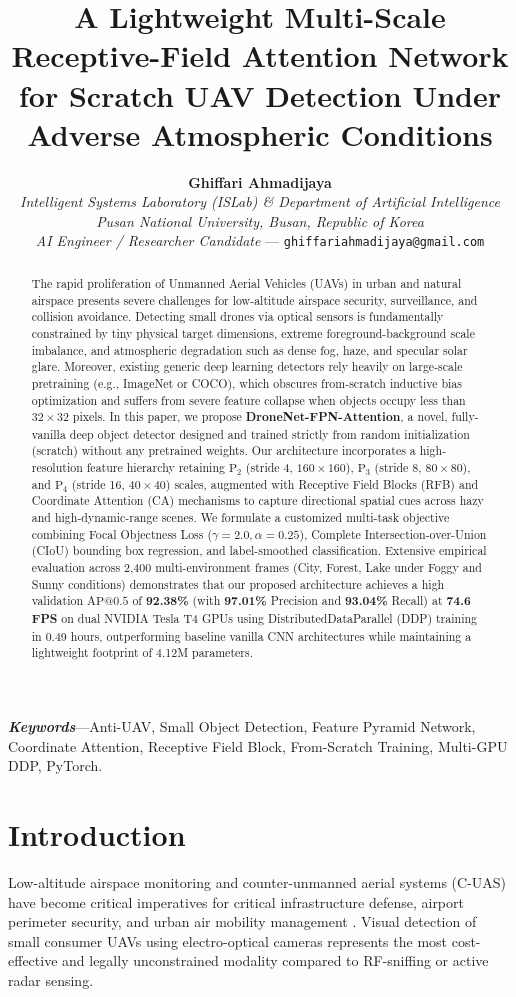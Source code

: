 \documentclass[10pt,conference,letterpaper,twocolumn]{article}
\title{\LARGE \bf A Lightweight Multi-Scale Receptive-Field Attention Network for Scratch UAV Detection Under Adverse Atmospheric Conditions}
\author{
    \textbf{Ghiffari Ahmadijaya}\\
    \textit{Intelligent Systems Laboratory (ISLab) \& Department of Artificial Intelligence}\\
    \textit{Pusan National University, Busan, Republic of Korea}\\
    \textit{AI Engineer / Researcher Candidate} --- \texttt{ghiffariahmadijaya@gmail.com}
}
\date{}
\begin{document}
\maketitle

\begin{abstract}
The rapid proliferation of Unmanned Aerial Vehicles (UAVs) in urban and natural airspace presents severe challenges for low-altitude airspace security, surveillance, and collision avoidance. Detecting small drones via optical sensors is fundamentally constrained by tiny physical target dimensions, extreme foreground-background scale imbalance, and atmospheric degradation such as dense fog, haze, and specular solar glare. Moreover, existing generic deep learning detectors rely heavily on large-scale pretraining (e.g., ImageNet or COCO), which obscures from-scratch inductive bias optimization and suffers from severe feature collapse when objects occupy less than $32\times 32$ pixels. In this paper, we propose \textbf{DroneNet-FPN-Attention}, a novel, fully-vanilla deep object detector designed and trained strictly from random initialization (scratch) without any pretrained weights. Our architecture incorporates a high-resolution feature hierarchy retaining $\text{P}_2$ (stride 4, $160\times 160$), $\text{P}_3$ (stride 8, $80\times 80$), and $\text{P}_4$ (stride 16, $40\times 40$) scales, augmented with Receptive Field Blocks (RFB) and Coordinate Attention (CA) mechanisms to capture directional spatial cues across hazy and high-dynamic-range scenes. We formulate a customized multi-task objective combining Focal Objectness Loss ($\gamma=2.0, \alpha=0.25$), Complete Intersection-over-Union (CIoU) bounding box regression, and label-smoothed classification. Extensive empirical evaluation across 2,400 multi-environment frames (City, Forest, Lake under Foggy and Sunny conditions) demonstrates that our proposed architecture achieves a high validation $\text{AP}@0.5$ of \textbf{92.38\%} (with \textbf{97.01\%} Precision and \textbf{93.04\%} Recall) at \textbf{74.6 FPS} on dual NVIDIA Tesla T4 GPUs using DistributedDataParallel (DDP) training in 0.49 hours, outperforming baseline vanilla CNN architectures while maintaining a lightweight footprint of 4.12M parameters.
\end{abstract}

\textbf{\textit{Keywords}}---Anti-UAV, Small Object Detection, Feature Pyramid Network, Coordinate Attention, Receptive Field Block, From-Scratch Training, Multi-GPU DDP, PyTorch.

\section{Introduction}
Low-altitude airspace monitoring and counter-unmanned aerial systems (C-UAS) have become critical imperatives for critical infrastructure defense, airport perimeter security, and urban air mobility management \cite{uav_survey2023, anti_uav_bench2022}. Visual detection of small consumer UAVs using electro-optical cameras represents the most cost-effective and legally unconstrained modality compared to RF-sniffing or active radar sensing.
\end{document}
